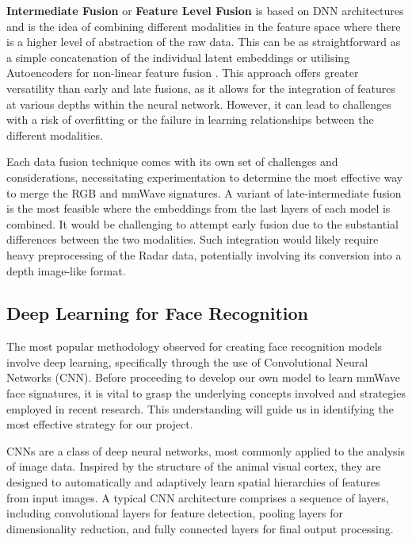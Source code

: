 \documentclass{interim}
\begin{document}
\textbf{Intermediate Fusion} or \textbf{Feature Level Fusion} is based on DNN architectures and is the idea of combining different modalities in the feature space where there is a higher level of abstraction of the raw data. This can be as straightforward as a simple concatenation of the individual latent embeddings or utilising Autoencoders for non-linear feature fusion \cite{charte2018practical}. This approach offers greater versatility than early and late fusions, as it allows for the integration of features at various depths within the neural network. However, it can lead to challenges with a risk of overfitting or the failure in learning relationships between the different modalities.

Each data fusion technique comes with its own set of challenges and considerations, necessitating experimentation to determine the most effective way to merge the RGB and mmWave signatures. A variant of late-intermediate fusion is the most feasible where the embeddings from the last layers of each model is combined. It would be challenging to attempt early fusion due to the substantial differences between the two modalities. Such integration would likely require heavy preprocessing of the Radar data, potentially involving its conversion into a depth image-like format. 


\subsection{Deep Learning for Face Recognition}
The most popular methodology observed for creating face recognition models involve deep learning, specifically through the use of Convolutional Neural Networks (CNN). Before proceeding to develop our own model to learn mmWave face signatures, it is vital to grasp the underlying concepts involved and strategies employed in recent research. This understanding will guide us in identifying the most effective strategy for our project.

CNNs are a class of deep neural networks, most commonly applied to the analysis of image data. Inspired by the structure of the animal visual cortex, they are designed to automatically and adaptively learn spatial hierarchies of features from input images. A typical CNN architecture comprises a sequence of layers, including convolutional layers for feature detection, pooling layers for dimensionality reduction, and fully connected layers for final output processing.
\end{document}
